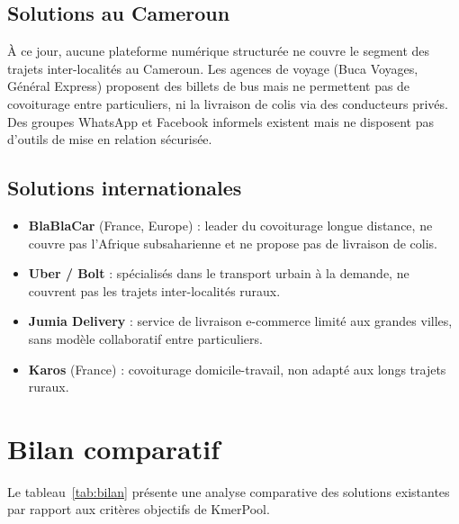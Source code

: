 \documentclass[12pt, a4paper]{report}
\begin{document}
\subsection{Solutions au Cameroun}

À ce jour, aucune plateforme numérique structurée ne couvre le segment des trajets
inter-localités au Cameroun. Les agences de voyage (Buca Voyages, Général Express)
proposent des billets de bus mais ne permettent pas de covoiturage entre particuliers,
ni la livraison de colis via des conducteurs privés. Des groupes WhatsApp et Facebook
informels existent mais ne disposent pas d'outils de mise en relation sécurisée.

\subsection{Solutions internationales}

\begin{itemize}
  \item \textbf{BlaBlaCar} (France, Europe) : leader du covoiturage longue distance,
        ne couvre pas l'Afrique subsaharienne et ne propose pas de livraison de colis.
  \item \textbf{Uber / Bolt} : spécialisés dans le transport urbain à la demande,
        ne couvrent pas les trajets inter-localités ruraux.
  \item \textbf{Jumia Delivery} : service de livraison e-commerce limité aux grandes
        villes, sans modèle collaboratif entre particuliers.
  \item \textbf{Karos} (France) : covoiturage domicile-travail, non adapté aux longs
        trajets ruraux.
\end{itemize}

\section{Bilan comparatif}

Le tableau~\ref{tab:bilan} présente une analyse comparative des solutions existantes
par rapport aux critères objectifs de KmerPool.
\end{document}
